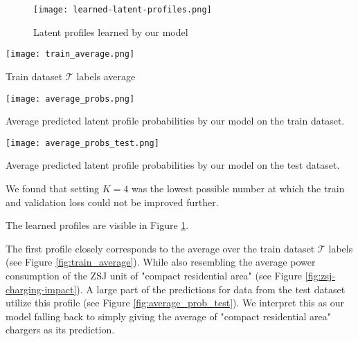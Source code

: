 \begin{figure}
    \texttt{[image: learned-latent-profiles.png]}
    \caption{Latent profiles learned by our model}
    \label{fig:learned-latent-profiles}
\end{figure}


\begin{marginfigure}
    \texttt{[image: train\_average.png]}
    \caption{Train dataset $\mathcal{T}$ labels average}
    \label{fig:train_average}
\end{marginfigure}

\begin{marginfigure}
    \texttt{[image: average\_probs.png]}
    \caption{Average predicted latent profile probabilities by our model on the train dataset.}
    \label{fig:average_prob}
\end{marginfigure}

\begin{marginfigure}
    \texttt{[image: average\_probs\_test.png]}
    \caption{Average predicted latent profile probabilities by our model on the test dataset.}
    \label{fig:average_prob_test}
\end{marginfigure}

We found that setting $K=4$ was the lowest possible number at which the train and validation loss could not be improved further.


The learned profiles are visible in Figure \ref{fig:learned-latent-profiles}.

The first profile closely corresponds to the average over the train dataset $\mathcal{T}$ labels (see Figure \ref{fig:train_average}). While also resembling the average power consumption of the ZSJ unit of "compact residential area" (see Figure \ref{fig:zsj-charging-impact}). A large part of the predictions for data from the test dataset utilize this profile (see Figure \ref{fig:average_prob_test}). We interpret this as our model falling back to simply giving the average of "compact residential area" chargers as its prediction.

